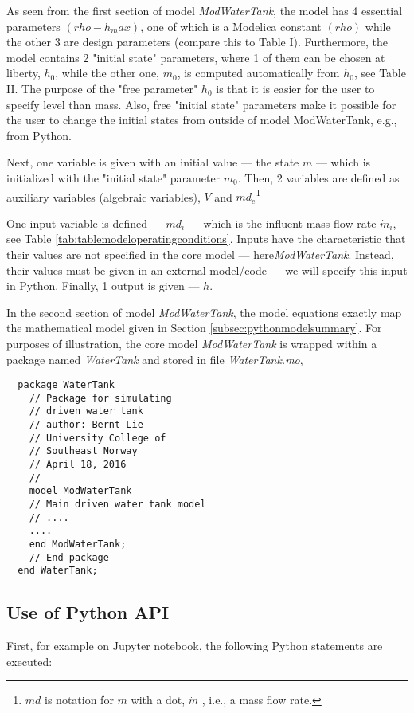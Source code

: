 As seen from the first section of model \textit{ModWaterTank}, the model has 4 essential parameters
$(rho-h_max)$, one of which is a Modelica constant $(rho)$ while the other 3 are design parameters (compare this
to Table I). Furthermore, the model contains 2 "initial state" parameters, where 1 of them can be chosen at
liberty, $h_0$, while the other one, $m_0$, is computed automatically from $h_0$, see Table II. The purpose of
the "free parameter" $h_0$ is that it is easier for the user to specify level than mass. Also, free "initial state"
parameters make it possible for the user to change the initial states from outside of model ModWaterTank, e.g., from Python.

Next, one variable is given with an initial value — the state $m$ — which is initialized with the "initial state" parameter
$m_0$. Then, 2 variables are defined as auxiliary variables (algebraic variables), $V$ and $md_e$\footnote{$md$ is notation for $m$ with a dot, $\dot{m}$ , i.e., a mass flow rate.}

One input variable is defined — $md_i$ — which is the influent mass flow rate $\dot{m}_i$, see Table \ref{tab:tablemodeloperatingconditions}. Inputs have the characteristic that their values are not specified in the core model — here\textit{ModWaterTank}. Instead,
their values must be given in an external model/code — we will specify this input in Python. Finally, 1 output is
given — $h$.

In the second section of model \textit{ModWaterTank}, the model equations exactly map the mathematical model
given in Section \ref{subsec:pythonmodelsummary}. For purposes of illustration, the core model \textit{ModWaterTank} is wrapped within a package named
\textit{WaterTank} and stored in file \textit{WaterTank.mo},


\begin{lstlisting}
  package WaterTank
    // Package for simulating
    // driven water tank
    // author: Bernt Lie
    // University College of
    // Southeast Norway
    // April 18, 2016
    //
    model ModWaterTank
    // Main driven water tank model
    // ....
    ....
    end ModWaterTank;
    // End package
  end WaterTank;
\end{lstlisting}

\subsection{Use of Python API}
\label{subsec:pythonuseapi}

First, for example on Jupyter notebook, the following Python statements are executed:

